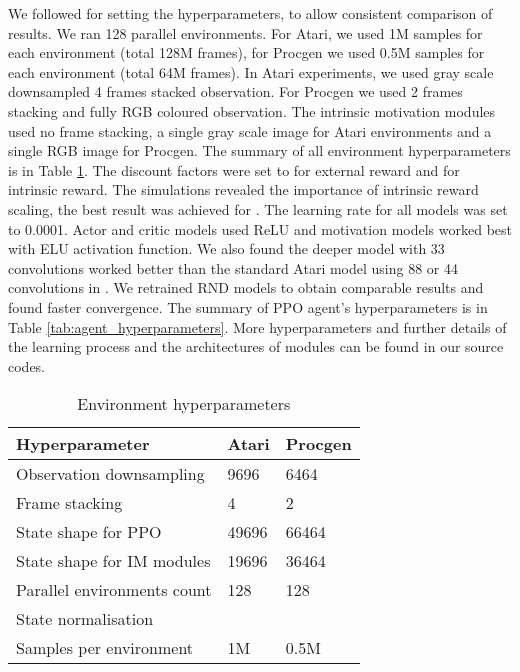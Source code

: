 \documentclass[a4paper,11pt]{elsarticle}
\begin{document}
We followed \citep{burda2018exploration} for setting the hyperparameters, to allow consistent comparison of results. 
We ran 128 parallel environments.
For Atari, we used 1M samples for each environment  (total 128M frames), for Procgen we used 0.5M samples for each environment (total 64M frames). 
In Atari experiments, we used gray scale downsampled 4 frames stacked observation. 
For Procgen we used 2 frames stacking and fully RGB coloured observation. The intrinsic motivation modules used no frame stacking, a single gray scale image for Atari  environments and a single RGB image for Procgen.
The summary of all environment hyperparameters is in Table \ref{tab:env_hyperparameters}.
The discount factors were set to  for external reward and  for intrinsic reward.
The simulations revealed the importance of intrinsic reward scaling, the best result was achieved for .
The learning rate for all models was set to 0.0001. Actor and critic models used ReLU and motivation models worked best with ELU activation function. We also found the deeper model with 33 convolutions worked better than the standard Atari model using 88 or 44 convolutions in \citep{mnih2013playing}. We retrained RND models to obtain comparable results and found faster convergence. The summary of PPO agent's hyperparameters is in Table \ref{tab:agent_hyperparameters}.
More hyperparameters and further details of the learning process and the architectures of modules can be found in our source codes.

\begin{table}[thb]
\scriptsize
\centering
\caption{Environment hyperparameters}
  \begin{tabular}{l|ll}
      Hyperparameter & Atari & Procgen  \\ 
      \hline\hline
      Observation downsampling & 9696 & 6464 \\
      Frame stacking & 4 & 2 \\
      State shape for PPO & 49696 & 66464 \\
      State shape for IM modules & 19696 & 36464 \\
      Parallel environments count & 128 & 128 \\
      State normalisation &  &  \\
      Samples per environment & 1M & 0.5M \\
      \hline
  \end{tabular}\label{tab:env_hyperparameters}
\end{table}
\end{document}
